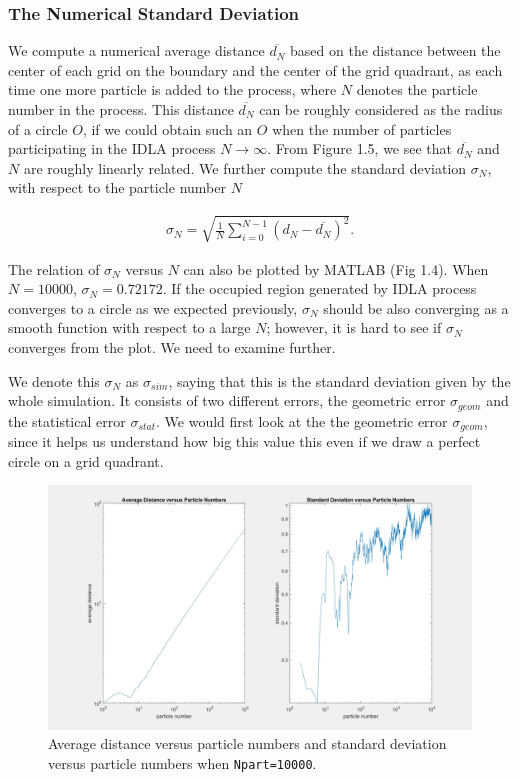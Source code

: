 \documentclass[letterpaper]{article}
\numberwithin{equation}{section} %
\numberwithin{figure}{section} %
\numberwithin{table}{section} %
\begin{document}
\subsubsection{The Numerical Standard Deviation}
We compute a numerical average distance $\overline{d_N}$ based on the distance between the center of each grid on the boundary and the center of the grid quadrant, as each time one more particle is added to the process, where $N$ denotes the particle number in the process. This distance $\overline{d_N}$ can be roughly considered as the radius of a circle $O$, if we could obtain such an $O$ when the number of particles participating in the IDLA process $N \rightarrow \infty$. From Figure 1.5, we see that $\overline{d_N}$ and $N$ are roughly linearly related. We further compute the standard deviation $\sigma_N$, with respect to the particle number $N$

\begin{align} 
\sigma_N = \sqrt{\frac{1}{N} \sum_{i=0}^{N-1} (d_N-\overline{d_N})^2}.
\end{align}

\noindent
The relation of $\sigma_N$ versus $N$ can also be plotted by MATLAB (Fig 1.4). When $N=10000$, $\sigma_N=0.72172$. If the occupied region generated by IDLA process converges to a circle as we expected previously, $\sigma_N$ should be also converging as a smooth function with respect to a large $N$; however, it is hard to see if $\sigma_N$ converges from the plot. We need to examine further.

We denote this $\sigma_N$ as $\sigma_{sim}$, saying that this is the standard deviation given by the whole simulation. It consists of two different errors, the geometric error $\sigma_{geom}$ and the statistical error $\sigma_{stat}$. We would first look at the the geometric error $\sigma_{geom}$, since it helps us understand how big this value this even if we draw a perfect circle on a grid quadrant.

\begin{figure}[h]
	\centering
	\includegraphics[width=0.7\linewidth]{bdryRandSTD}
	\caption{Average distance versus particle numbers and standard deviation versus particle numbers when \texttt{Npart=10000}.}
	\label{fig:bdryRandSTD}
\end{figure}
\end{document}
